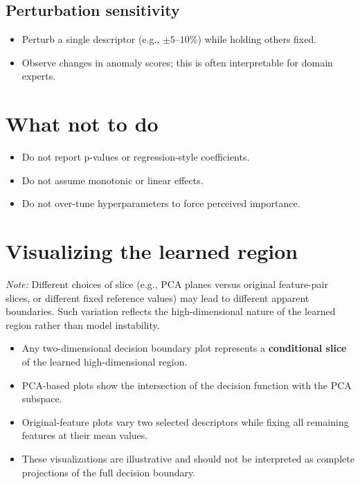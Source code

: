 \documentclass[11pt]{article}
\begin{document}
\subsection{Perturbation sensitivity}
\begin{itemize}
\item Perturb a single descriptor (e.g., $\pm 5$--$10\%$) while holding others fixed.
\item Observe changes in anomaly scores; this is often interpretable for domain experts.
\end{itemize}

\section{What not to do}

\begin{itemize}
\item Do not report p-values or regression-style coefficients.
\item Do not assume monotonic or linear effects.
\item Do not over-tune hyperparameters to force perceived importance.
\end{itemize}

\section{Visualizing the learned region}

\noindent\emph{Note:} Different choices of slice (e.g., PCA planes versus original feature-pair slices, or different fixed reference values) may lead to different apparent boundaries. Such variation reflects the high-dimensional nature of the learned region rather than model instability.

\begin{itemize}
\item Any two-dimensional decision boundary plot represents a \textbf{conditional slice} of the learned high-dimensional region.
\item PCA-based plots show the intersection of the decision function with the PCA subspace.
\item Original-feature plots vary two selected descriptors while fixing all remaining features at their mean values.
\item These visualizations are illustrative and should not be interpreted as complete projections of the full decision boundary.
\end{itemize}
\end{document}
